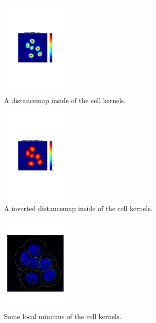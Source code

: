 \documentclass[10pt,twocolumn]{article}
\begin{document}
\begin{figure}[ht]
\centering
\includegraphics[width=0.3\textwidth]{Bilder/DistanceTransformInsideKernels.pdf}
\caption{A distancemap inside of the cell kernels.}
\label{fig:CellKernelsDist}
\end{figure}

\begin{figure}[ht]
\centering
\includegraphics[width=0.3\textwidth]{Bilder/InvertedDistanceMap.pdf}
\caption{A inverted distancemap inside of the cell kernels.}
\label{fig:CellKernelsDistInv}
\end{figure}

\begin{figure}[ht]
\centering
\includegraphics[width=0.3\textwidth]{Bilder/CellLinesNCircles.pdf}
\caption{Some local minimus of the cell kernels.}
\label{fig:CellKernelsMinimum}
\end{figure}
\end{document}
